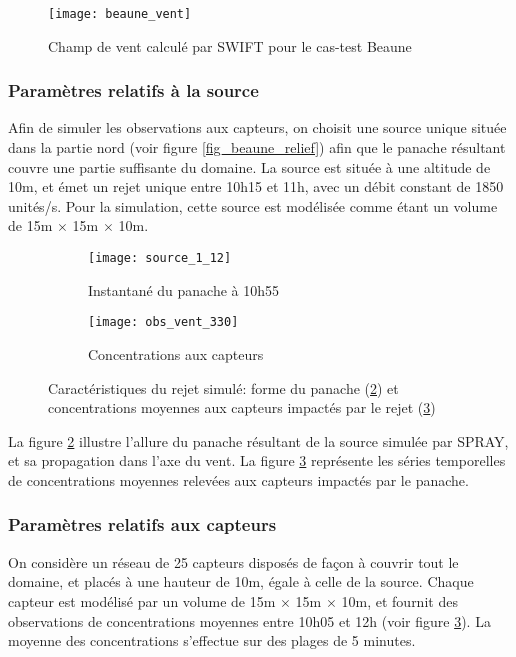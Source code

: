 \begin{figure}[h!]
	\centering
	\texttt{[image: beaune\_vent]}
	\caption{Champ de vent calculé par SWIFT pour le cas-test Beaune}
	\label{fig_beaune_vent}
\end{figure}


\subsubsection{Paramètres relatifs à la source}
Afin de simuler les observations aux capteurs, on choisit une source unique située dans la partie nord (voir figure \ref{fig_beaune_relief}) afin que le panache résultant couvre une partie suffisante du domaine. La source est située à une altitude de 10m, et émet un rejet unique entre 10h15 et 11h, avec un débit constant de 1850 unités/s. Pour la simulation, cette source est modélisée comme étant un volume de 15m $\times$ 15m $\times$ 10m. \\

\begin{figure}[h!]
	\centering
	\begin{subfigure}[t]{0.5\textwidth}
		\centering
		\texttt{[image: source\_1\_12]}
		\caption{Instantané du panache à 10h55}
		\label{panache}
	\end{subfigure}%
	\centering
	\begin{subfigure}[t]{0.5\textwidth}
		\centering
		\texttt{[image: obs\_vent\_330]}
		\caption{Concentrations aux capteurs}
		\label{series_temporelles}
	\end{subfigure}
	\caption{Caractéristiques du rejet simulé: forme du panache (\ref{panache}) et concentrations moyennes aux capteurs impactés par le rejet (\ref{series_temporelles})}
	\label{fig_rejet_beaune} 
\end{figure}


La figure \ref{panache} illustre l'allure du panache résultant de la source simulée par SPRAY, et sa propagation dans l'axe du vent. La figure \ref{series_temporelles} représente les séries temporelles de concentrations moyennes relevées aux capteurs impactés par le panache.

\subsubsection{Paramètres relatifs aux capteurs}
On considère un réseau de 25 capteurs disposés de façon à couvrir tout le domaine, et placés à une hauteur de 10m, égale à celle de la source. Chaque capteur est modélisé par un volume de 15m $\times$ 15m $\times$ 10m, et fournit des observations de concentrations moyennes entre 10h05 et 12h (voir figure \ref{series_temporelles}). La moyenne des concentrations s'effectue sur des plages de 5 minutes.

